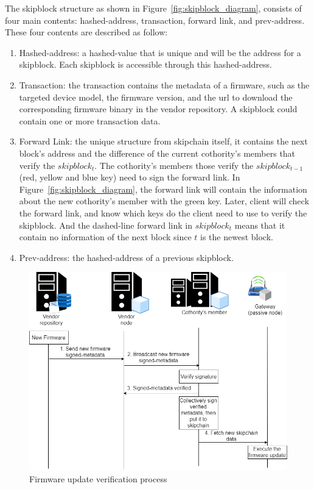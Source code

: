 The skipblock structure as shown in Figure~\ref{fig:skipblock_diagram}, consists of four main contents: hashed-address, transaction, forward link, and prev-address. These four contents are described as follow:
~\begin{enumerate}
	\item Hashed-address: a hashed-value that is unique and will be the address for a skipblock. Each skipblock is accessible through this hashed-address.
	\item Transaction: the transaction contains the metadata of a firmware, such as the targeted device model, the firmware version, and the url to download the corresponding firmware binary in the vendor repository. A skipblock could contain one or more transaction data.
	\item Forward Link: the unique structure from skipchain itself, it contains the next block's address and the difference of the current cothority's members that verify the $skipblock_t$. The cothority's members those verify the $skipblock_{t-1}$ (red, yellow and blue key) need to sign the forward link. In Figure~\ref{fig:skipblock_diagram}, the forward link will contain the information about the new cothority's member with the green key. Later, client will check the forward link, and know which keys do the client need to use to verify the skipblock. And the dashed-line forward link in $skipblock_t$ means that it contain no information of the next block since $t$ is the newest block.
	\item Prev-address: the hashed-address of a previous skipblock.
\end{enumerate}

\begin{figure}[H]
	\begin{center}
		\includegraphics[width=1.0\textwidth]{figures/firmware_update-Firmware_verification_process.png}
		\caption{Firmware update verification process} 
		\label{fig:verificationprocess}
	\end{center}
\end{figure}

